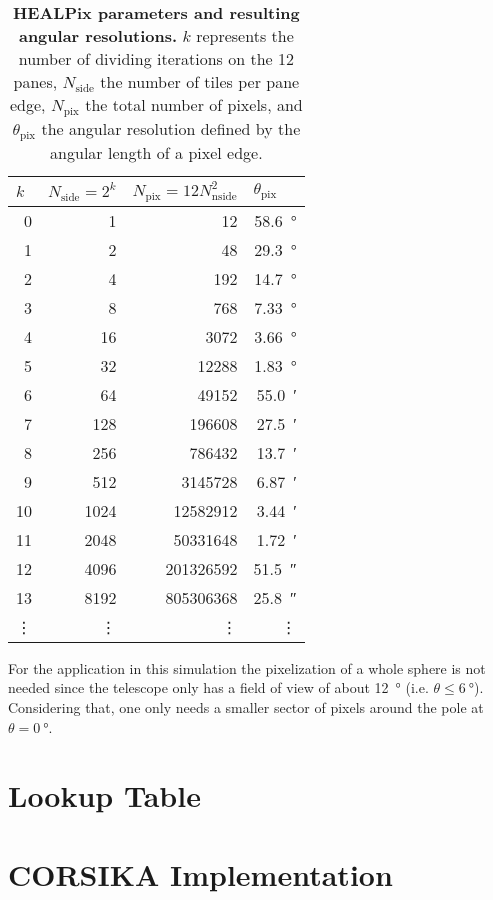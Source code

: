\begin{table}[H]
\centering
\begin{tabular}{r|r|r|r}
\multicolumn{1}{l|}{$k$} & \multicolumn{1}{l|}{$N_\text{side} = 2^k$} & \multicolumn{1}{l|}{$N_\text{pix} = 12N_\text{nside}^2$} & \multicolumn{1}{l}{$\theta_\text{pix}$} \\
\hline
0  & 1    & 12        &  \SI{58.6}{\degree}\\
1  & 2    & 48        &  \SI{29.3}{\degree}\\
2  & 4    & 192       &  \SI{14.7}{\degree}\\
3  & 8    & 768 	  &  \SI{7.33}{\degree}\\
4  & 16   & 3072      &  \SI{3.66}{\degree}\\
5  & 32   & 12288     &  \SI{1.83}{\degree}\\
6  & 64   & 49152     &  \SI{55.0}{\arcminute}\\
7  & 128  & 196608    &  \SI{27.5}{\arcminute}\\
8  & 256  & 786432    &  \SI{13.7}{\arcminute}\\
9  & 512  & 3145728   &  \SI{6.87}{\arcminute}\\
10 & 1024 & 12582912  &  \SI{3.44}{\arcminute}\\
11 & 2048 & 50331648  &  \SI{1.72}{\arcminute}\\
12 & 4096 & 201326592 &  \SI{51.5}{\arcsecond}\\
13 & 8192 & 805306368 &  \SI{25.8}{\arcsecond}\\
\vdots & \vdots & \vdots & \vdots \\
\end{tabular}
\caption{\textbf{HEALPix parameters and resulting angular resolutions.} $k$ represents the number of dividing iterations on the 12 panes, $N_\text{side}$ the number of tiles per pane edge, $N_\text{pix}$ the total number of pixels, and $\theta_\text{pix}$ the angular resolution defined by the angular length of a pixel edge. \cite{healpix:paper}}
\end{table}

For the application in this simulation the pixelization of a whole sphere is not needed since the telescope only has a field of view of about \SI{12}{\degree} (i.e. $\theta \leq \SI{6}{\degree}$). Considering that, one only needs a smaller sector of pixels around the pole at $\theta = \SI{0}{\degree}$. 

\section{Lookup Table}

\section{CORSIKA Implementation}
